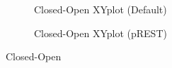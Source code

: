 \documentclass[T4paper.tex]{subfiles}
\begin{document}
\begin{figure}
\centering
\begin{subfigure}{.5\textwidth}
  \centering
   \caption{Closed-Open XYplot (Default)}
   \label{fig:C2O_xyplot}
\end{subfigure}%
\begin{subfigure}{.5\textwidth}
   \centering
   \caption{Closed-Open XYplot (pREST)}
   \label{fig:C2O_xyplot_pREST}
\end{subfigure}
\caption{Closed-Open}
\label{fig:C2O_xy}
\end{figure}
\end{document}
